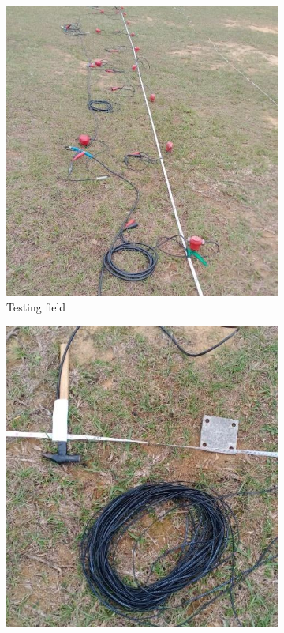 \begin{figure}[!t]
    \centering
    \begin{subfigure}[b]{0.45\textwidth}
        \centering
        \includegraphics[width=\textwidth]{images/fieldtesta}
        \caption{Testing field}
        \label{fig:fieldtesta}
    \end{subfigure}
    \hfill
    \begin{subfigure}[b]{0.45\textwidth}
        \centering
        \includegraphics[width=\textwidth]{images/fieldtestb}

\end{subfigure}
\end{figure}
